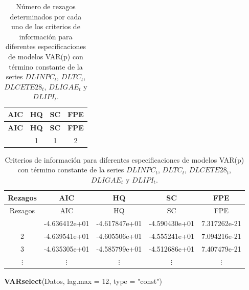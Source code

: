\documentclass[
]{book}
\newenvironment{Shaded}{\begin{snugshade}}{\end{snugshade}}
\newcommand{\AttributeTok}[1]{\textcolor[rgb]{0.13,0.29,0.53}{#1}}
\newcommand{\DecValTok}[1]{\textcolor[rgb]{0.00,0.00,0.81}{#1}}
\newcommand{\FunctionTok}[1]{\textcolor[rgb]{0.13,0.29,0.53}{\textbf{#1}}}
\newcommand{\NormalTok}[1]{#1}
\newcommand{\StringTok}[1]{\textcolor[rgb]{0.31,0.60,0.02}{#1}}
\begin{document}
\begin{longtable}[]{@{}cccc@{}}
\caption{\label{tab:NumSelectVAR} Número de rezagos determinados por cada uno de los criterios de información para diferentes especificaciones de modelos VAR(p) con término constante de la series \(DLINPC_t\), \(DLTC_t\), \(DLCETE28_t\), \(DLIGAE_t\) y \(DLIPI_t\).}\tabularnewline
\toprule\noalign{}
\textbf{AIC} & \textbf{HQ} & \textbf{SC} & \textbf{FPE} \\
\midrule\noalign{}
\endfirsthead
\toprule\noalign{}
\textbf{AIC} & \textbf{HQ} & \textbf{SC} & \textbf{FPE} \\
\midrule\noalign{}
\endhead
\bottomrule\noalign{}
\endlastfoot
2 & 1 & 1 & 2 \\
\end{longtable}

\begin{longtable}[]{@{}ccccc@{}}
\caption{\label{tab:SelectVAR} Criterios de información para diferentes especificaciones de modelos VAR(p) con término constante de la series \(DLINPC_t\), \(DLTC_t\), \(DLCETE28_t\), \(DLIGAE_t\) y \(DLIPI_t\).}\tabularnewline
\toprule\noalign{}
Rezagos & AIC & HQ & SC & FPE \\
\midrule\noalign{}
\endfirsthead
\toprule\noalign{}
Rezagos & AIC & HQ & SC & FPE \\
\midrule\noalign{}
\endhead
\bottomrule\noalign{}
\endlastfoot
1 & -4.636412e+01 & -4.617847e+01 & -4.590430e+01 & 7.317262e-21 \\
2 & -4.639541e+01 & -4.605506e+01 & -4.555241e+01 & 7.094216e-21 \\
3 & -4.635305e+01 & -4.585799e+01 & -4.512686e+01 & 7.407479e-21 \\
\(\vdots\) & \(\vdots\) & \(\vdots\) & \(\vdots\) & \(\vdots\) \\
\end{longtable}

\begin{Shaded}
\begin{Highlighting}[]
\FunctionTok{VARselect}\NormalTok{(Datos, }\AttributeTok{lag.max =} \DecValTok{12}\NormalTok{, }\AttributeTok{type =} \StringTok{"const"}\NormalTok{)}
\end{Highlighting}
\end{Shaded}
\end{document}
